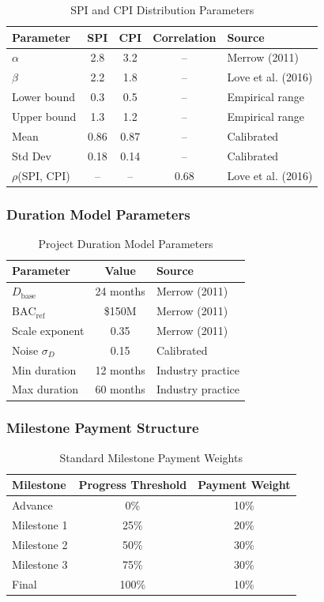 \begin{table}[h]
\centering
\caption{SPI and CPI Distribution Parameters}
\begin{tabular}{lcccl}
\toprule
Parameter & SPI & CPI & Correlation & Source \\
\midrule
$\alpha$ & 2.8 & 3.2 & -- & Merrow (2011) \\
$\beta$ & 2.2 & 1.8 & -- & Love et al. (2016) \\
Lower bound & 0.3 & 0.5 & -- & Empirical range \\
Upper bound & 1.3 & 1.2 & -- & Empirical range \\
Mean & 0.86 & 0.87 & -- & Calibrated \\
Std Dev & 0.18 & 0.14 & -- & Calibrated \\
$\rho$(SPI, CPI) & -- & -- & 0.68 & Love et al. (2016) \\
\bottomrule
\end{tabular}
\end{table}

\subsubsection{Duration Model Parameters}

\begin{table}[h]
\centering
\caption{Project Duration Model Parameters}
\begin{tabular}{lcl}
\toprule
Parameter & Value & Source \\
\midrule
$D_{\text{base}}$ & 24 months & Merrow (2011) \\
$\text{BAC}_{\text{ref}}$ & \$150M & Merrow (2011) \\
Scale exponent & 0.35 & Merrow (2011) \\
Noise $\sigma_D$ & 0.15 & Calibrated \\
Min duration & 12 months & Industry practice \\
Max duration & 60 months & Industry practice \\
\bottomrule
\end{tabular}
\end{table}

\subsubsection{Milestone Payment Structure}

\begin{table}[h]
\centering
\caption{Standard Milestone Payment Weights}
\begin{tabular}{lcc}
\toprule
Milestone & Progress Threshold & Payment Weight \\
\midrule
Advance & 0\% & 10\% \\
Milestone 1 & 25\% & 20\% \\
Milestone 2 & 50\% & 30\% \\
Milestone 3 & 75\% & 30\% \\
Final & 100\% & 10\% \\
\bottomrule
\end{tabular}
\label{tab:milestone_weights}
\end{table}

